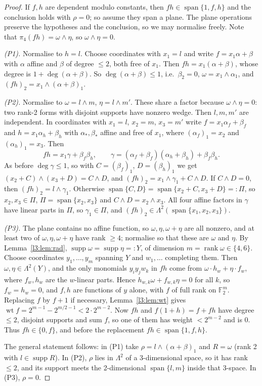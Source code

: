 \documentclass[11pt,a4paper]{article}
\theoremstyle{plain}
\theoremstyle{remark}
\newcommand{\F}{\mathbb F_2}
\newcommand{\Span}{\operatorname{span}}
\newcommand{\supp}{\operatorname{supp}}
\newcommand{\rk}{\operatorname{rank}}
\newcommand{\wt}{\operatorname{wt}}
\newcommand{\Lam}{\Lambda^2}
\begin{document}
\begin{proof}
If $f,h$ are dependent modulo constants, then $fh\in\Span\{1,f,h\}$ and the conclusion holds with $\rho=0$; so assume they span a plane. The plane operations preserve the hypotheses and the conclusion, so we may normalise freely. Note that $\pi_4(fh)=\omega\wedge\eta$, so $\omega\wedge\eta=0$.

\emph{(P1).} Normalise to $h=l$. Choose coordinates with $x_1=l$ and write $f=x_1\alpha+\beta$ with $\alpha$ affine and $\beta$ of degree $\le2$, both free of $x_1$. Then $fh=x_1(\alpha+\beta)$, whose degree is $1+\deg(\alpha+\beta)$. So $\deg(\alpha+\beta)\le1$, i.e.\ $\beta_2=0$, $\omega=x_1\wedge\alpha_1$, and $(fh)_2=x_1\wedge(\alpha+\beta)_1$.

\emph{(P2).} Normalise to $\omega=l\wedge m$, $\eta=l\wedge m'$. These share a factor because $\omega\wedge\eta=0$: two rank-2 forms with disjoint supports have nonzero wedge. Then $l,m,m'$ are independent. In coordinates with $x_1=l$, $x_2=m$, $x_3=m'$ write $f=x_1\alpha_f+\beta_f$ and $h=x_1\alpha_h+\beta_h$ with $\alpha_\ast,\beta_\ast$ affine and free of $x_1$, where $(\alpha_f)_1=x_2$ and $(\alpha_h)_1=x_3$. Then
\[
fh=x_1\gamma+\beta_f\beta_h,\qquad \gamma=(\alpha_f+\beta_f)(\alpha_h+\beta_h)+\beta_f\beta_h .
\]
As before $\deg\gamma\le1$, so with $C=(\beta_f)_1$, $D=(\beta_h)_1$ we get $(x_2+C)\wedge(x_3+D)=C\wedge D$, and $(fh)_2=x_1\wedge\gamma_1+C\wedge D$. If $C\wedge D=0$, then $(fh)_2=l\wedge\gamma_1$. Otherwise $\Span\{C,D\}=\Span\{x_2+C,x_3+D\}=:\Pi$, so $x_2,x_3\in\Pi$, $\Pi=\Span\{x_2,x_3\}$ and $C\wedge D=x_2\wedge x_3$. All four affine factors in $\gamma$ have linear parts in $\Pi$, so $\gamma_1\in\Pi$, and $(fh)_2\in\Lam(\Span\{x_1,x_2,x_3\})$.

\emph{(P3).} The plane contains no affine function, so $\omega,\eta,\omega+\eta$ are all nonzero, and at least two of $\omega,\eta,\omega+\eta$ have rank $\ge4$; normalise so that these are $\omega$ and $\eta$. By Lemma~\ref{l3:lem:rad}, $\supp\omega=\supp\eta=:Y$, of dimension $m=\rk\omega\in\{4,6\}$. Choose coordinates $y_1,\dots,y_m$ spanning $Y$ and $w_1,\dots$ completing them. Then $\omega,\eta\in\Lam(Y)$, and the only monomials $y_iy_jw_k$ in $fh$ come from $\omega\cdot h_w+\eta\cdot f_w$, where $f_w,h_w$ are the $w$-linear parts. Hence $h_{w,k}\omega+f_{w,k}\eta=0$ for all $k$, so $f_w=h_w=0$, and $f,h$ are functions of $y$ alone, with $f$ of full rank on $\F^m$. Replacing $f$ by $f+1$ if necessary, Lemma~\ref{l3:lem:wt} gives $\wt f=2^{m-1}-2^{m/2-1}<2\cdot 2^{m-2}$. Now $fh$ and $f(1+h)=f+fh$ have degree $\le2$, disjoint supports and sum $f$, so one of them has weight $<2^{m-2}$ and is $0$. Thus $fh\in\{0,f\}$, and before the replacement $fh\in\Span\{1,f,h\}$.

The general statement follows: in (P1) take $\rho=l\wedge(\alpha+\beta)_1$ and $R=\omega$ (rank 2 with $l\in\supp R$). In (P2), $\rho$ lies in $\Lam$ of a 3-dimensional space, so it has rank $\le2$, and its support meets the 2-dimensional $\Span\{l,m\}$ inside that 3-space. In (P3), $\rho=0$.
\end{proof}
\end{document}
